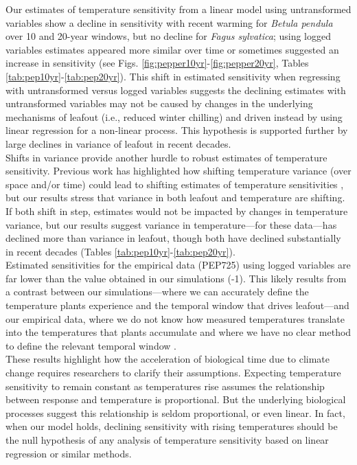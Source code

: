 \documentclass[11pt]{article}
\begin{document}
Our estimates of temperature sensitivity from a linear model using untransformed variables show a decline in sensitivity with recent warming for \emph{Betula pendula} over 10 and 20-year windows, but no decline for \emph{Fagus sylvatica}; using logged variables estimates appeared more similar over time or sometimes suggested an increase in sensitivity (see Figs. \ref{fig:pepper10yr}-\ref{fig:pepper20yr}, Tables \ref{tab:pep10yr}-\ref{tab:pep20yr}). This shift in estimated sensitivity when regressing with untransformed versus logged variables suggests the declining estimates with untransformed variables may not be caused by changes in the underlying mechanisms of leafout (i.e., reduced winter chilling) and driven instead by using linear regression for a non-linear process. This hypothesis is supported further by large declines in variance of leafout in recent decades. \\

Shifts in variance provide another hurdle to robust estimates of temperature sensitivity. Previous work has highlighted how shifting temperature variance (over space and/or time) could lead to shifting estimates of temperature sensitivities \citep{keenan2019}, but our results stress that variance in both leafout and temperature are shifting. If both shift in step, estimates would not be impacted by changes in temperature variance, but our results suggest variance in temperature---for these data---has declined more than variance in leafout, though both have declined substantially in recent decades (Tables \ref{tab:pep10yr}-\ref{tab:pep20yr}). \\

Estimated sensitivities for the empirical data (PEP725) using logged variables are far lower than the value obtained in our simulations (-1). This likely results from a contrast between our simulations---where we can accurately define the temperature plants experience and the temporal window that drives leafout---and our empirical data, where we do not know how measured temperatures translate into the temperatures that plants accumulate and where we have no clear method to define the relevant temporal window \citep{gusewell2017}. \\

These results highlight how the acceleration of biological time due to climate change requires researchers to clarify their assumptions. Expecting temperature sensitivity to remain constant as temperatures rise assumes the relationship between response and temperature is proportional. But the underlying biological processes suggest this relationship is seldom proportional, or even linear. In fact, when our model holds, declining sensitivity with rising temperatures should be the null hypothesis of any analysis of temperature sensitivity based on linear regression or similar methods. \\ %
\end{document}
